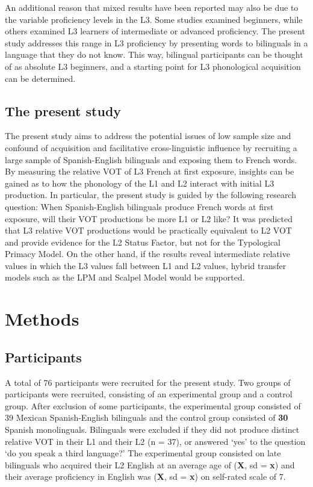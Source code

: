 \documentclass[
  english,
  man]{apa6}
\begin{document}
An additional reason that mixed results have been reported may also be due to the variable proficiency levels in the L3.
Some studies examined beginners, while others examined L3 learners of intermediate or advanced proficiency.
The present study addresses this range in L3 proficiency by presenting words to bilinguals in a language that they do not know.
This way, bilingual participants can be thought of as absolute L3 beginners, and a starting point for L3 phonological acquisition can be determined.

\hypertarget{the-present-study}{%
\subsection{The present study}\label{the-present-study}}

The present study aims to address the potential issues of low sample size and confound of acquisition and facilitative cross-linguistic influence by recruiting a large sample of Spanish-English bilinguals and exposing them to French words.
By measuring the relative VOT of L3 French at first exposure, insights can be gained as to how the phonology of the L1 and L2 interact with initial L3 production.
In particular, the present study is guided by the following research question: When Spanish-English bilinguals produce French words at first exposure, will their VOT productions be more L1 or L2 like?
It was predicted that L3 relative VOT productions would be practically equivalent to L2 VOT and provide evidence for the L2 Status Factor, but not for the Typological Primacy Model.
On the other hand, if the results reveal intermediate relative values in which the L3 values fall between L1 and L2 values, hybrid transfer models such as the LPM and Scalpel Model would be supported.

\hypertarget{methods}{%
\section{Methods}\label{methods}}

\hypertarget{participants}{%
\subsection{Participants}\label{participants}}

A total of 76 participants were recruited for the present study.
Two groups of participants were recruited, consisting of an experimental group and a control group. After exclusion of some participants, the experimental group consisted of 39 Mexican Spanish-English bilinguals and the control group consisted of \textbf{30} Spanish monolinguals.
Bilinguals were excluded if they did not produce distinct relative VOT in their L1 and their L2 (n = 37), or answered `yes' to the question `do you speak a third language?'
The experimental group consisted on late bilinguals who acquired their L2 English at an average age of (\textbf{X}, sd = \textbf{x}) and their average proficiency in English was (\textbf{X}, sd = \textbf{x}) on self-rated scale of 7.
\end{document}
